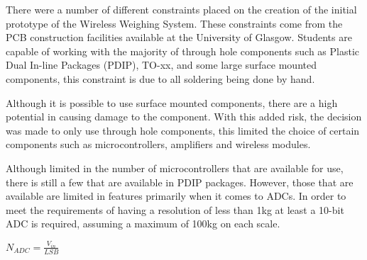 There were a number of different constraints placed on the creation of the initial prototype of the Wireless Weighing System. These constraints come from the PCB construction facilities available at the University of Glasgow. Students are capable of working with the majority of through hole components such as Plastic Dual In-line Packages (PDIP), TO-xx, and some large surface mounted components, this constraint is due to all soldering being done by hand.

Although it is possible to use surface mounted components, there are a high potential in causing damage to the component. With this added risk, the decision was made to only use through hole components, this limited the choice of certain components such as microcontrollers, amplifiers and wireless modules.

Although limited in the number of microcontrollers that are available for use, there is still a few that are available in PDIP packages. However, those that are available are limited in features primarily when it comes to ADCs. In order to meet the requirements of having a resolution of less than 1kg at least a 10-bit ADC is required, assuming a maximum of 100kg on each scale.

\begin{center}
$N_{ADC} = \frac{V_{in}}{LSB}$ \cite[page 8]{edp2}
\end{center}